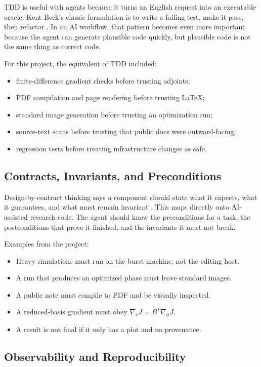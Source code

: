 \documentclass[11pt]{article}
\begin{document}
TDD is useful with agents because it turns an English request into an executable
oracle.  Kent Beck's classic formulation is to write a failing test, make it
pass, then refactor \cite{beck2002}.  In an AI workflow, that pattern becomes
even more important because the agent can generate plausible code quickly, but
plausible code is not the same thing as correct code.

For this project, the equivalent of TDD included:
\begin{itemize}
\item finite-difference gradient checks before trusting adjoints;
\item PDF compilation and page rendering before trusting LaTeX;
\item standard image generation before trusting an optimization run;
\item source-text scans before trusting that public docs were outward-facing;
\item regression tests before treating infrastructure changes as safe.
\end{itemize}

\subsection*{Contracts, Invariants, and Preconditions}

Design-by-contract thinking says a component should state what it expects, what
it guarantees, and what must remain invariant \cite{meyer1997}.  This maps
directly onto AI-assisted research code.  The agent should know the preconditions
for a task, the postconditions that prove it finished, and the invariants it
must not break.

Examples from the project:
\begin{itemize}
\item Heavy simulations must run on the burst machine, not the editing host.
\item A run that produces an optimized phase must leave standard images.
\item A public note must compile to PDF and be visually inspected.
\item A reduced-basis gradient must obey \(\nabla_c J = B^T\nabla_\phi J\).
\item A result is not final if it only has a plot and no provenance.
\end{itemize}

\subsection*{Observability and Reproducibility}
\end{document}
